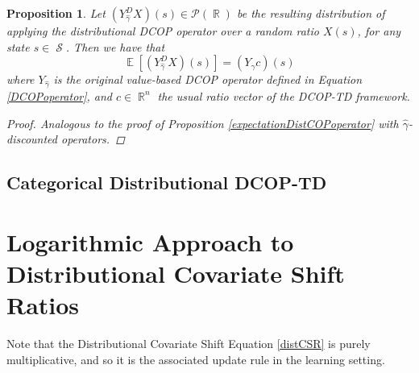 \documentclass[12pt,a4paper,openright,twoside]{article}
\DeclareMathOperator*{\E}{\mathbb{E}}
\DeclareMathOperator*{\R}{\mathbb{R}}
\DeclareMathOperator*{\Sspace}{\mathcal{S}}
\numberwithin{equation}{section}
\newtheorem{prop}[theorem]{Proposition}
\theoremstyle{definition}
\theoremstyle{remark}
\theoremstyle{plain}
\begin{document}
\begin{prop} \label{expectationDistDCOPoperator}
	Let $(Y^D_{\hat{\gamma}} X)(s)\in \mathscr{P}(\R)$ be the resulting distribution of applying the distributional DCOP operator over a random ratio $X(s)$, for any state $s \in \Sspace$.  Then we have that
	\begin{equation*}
		\E [(Y^D_{\hat{\gamma}} X)(s) ] = (Y_{\hat{\gamma}} c)(s)
	\end{equation*}
	where $Y_{\hat{\gamma}}$ is the original value-based DCOP operator defined in Equation \ref{DCOPoperator}, and $c\in \R^n$ the usual ratio vector of the DCOP-TD framework.
	
	\begin{proof}
	Analogous to the proof of Proposition \ref{expectationDistCOPoperator} with $\hat{\gamma}$-discounted operators.
	\end{proof}
\end{prop}









\subsection{Categorical Distributional DCOP-TD}






\newpage

\thispagestyle{plain}
\section{Logarithmic Approach to Distributional Covariate Shift Ratios}

Note that the Distributional Covariate Shift Equation \ref{distCSR} is purely multiplicative, and so it is the associated update rule in the learning setting. 
\end{document}
